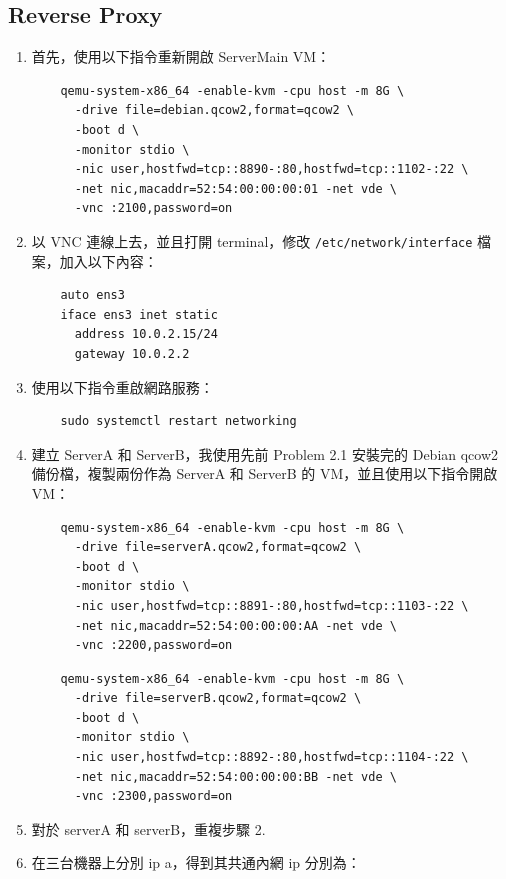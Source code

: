 \documentclass[12pt]{article}
\begin{document}
\subsection{Reverse Proxy}
\begin{enumerate}
  \item 首先，使用以下指令重新開啟 ServerMain VM：
  \begin{verbatim}
    qemu-system-x86_64 -enable-kvm -cpu host -m 8G \
      -drive file=debian.qcow2,format=qcow2 \
      -boot d \
      -monitor stdio \
      -nic user,hostfwd=tcp::8890-:80,hostfwd=tcp::1102-:22 \
      -net nic,macaddr=52:54:00:00:00:01 -net vde \
      -vnc :2100,password=on
  \end{verbatim}
  \item 以 VNC 連線上去，並且打開 terminal，修改 \texttt{/etc/network/interface} 檔案，加入以下內容：
  \begin{verbatim}
    auto ens3
    iface ens3 inet static
      address 10.0.2.15/24
      gateway 10.0.2.2
  \end{verbatim}
  \item 使用以下指令重啟網路服務：
  \begin{verbatim}
    sudo systemctl restart networking
  \end{verbatim}
  \item 建立 ServerA 和 ServerB，我使用先前 Problem 2.1 安裝完的 Debian qcow2 備份檔，複製兩份作為 ServerA 和 ServerB 的 VM，並且使用以下指令開啟 VM：
  \begin{verbatim}
    qemu-system-x86_64 -enable-kvm -cpu host -m 8G \
      -drive file=serverA.qcow2,format=qcow2 \
      -boot d \
      -monitor stdio \
      -nic user,hostfwd=tcp::8891-:80,hostfwd=tcp::1103-:22 \
      -net nic,macaddr=52:54:00:00:00:AA -net vde \
      -vnc :2200,password=on
  \end{verbatim}
  \vspace{-0.5cm}
  \begin{verbatim}
    qemu-system-x86_64 -enable-kvm -cpu host -m 8G \
      -drive file=serverB.qcow2,format=qcow2 \
      -boot d \
      -monitor stdio \
      -nic user,hostfwd=tcp::8892-:80,hostfwd=tcp::1104-:22 \
      -net nic,macaddr=52:54:00:00:00:BB -net vde \
      -vnc :2300,password=on
  \end{verbatim}
  \item 對於 serverA 和 serverB，重複步驟 2.
  \item 在三台機器上分別 ip a，得到其共通內網 ip 分別為：
  \begin{itemize}

\end{itemize}
\end{enumerate}
\end{document}
